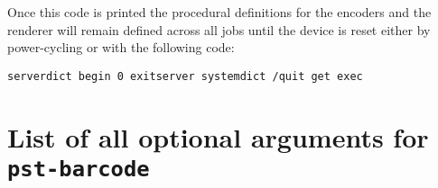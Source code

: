 \documentclass[11pt,english,BCOR10mm,DIV12,bibliography=totoc,parskip=false,smallheadings
    headexclude,footexclude,oneside]{pst-doc}
\begin{document}
Once this code is printed the procedural definitions for the encoders and
the renderer will remain defined across all jobs until the device is reset
either by power-cycling or with the following code:

\begin{lstlisting}
serverdict begin 0 exitserver systemdict /quit get exec
\end{lstlisting}



\section{List of all optional arguments for \texttt{pst-barcode}}



\bgroup
\raggedright
\nocite{*}


\egroup

\printindex
\end{document}
